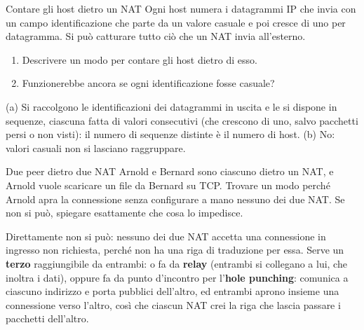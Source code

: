 \begin{esercizio}{Contare gli host dietro un NAT}
Ogni host numera i datagrammi IP che invia con un campo identificazione che parte da un valore casuale e poi cresce di uno per datagramma.
Si può catturare tutto ciò che un NAT invia all'esterno.
\begin{enumerate}[label=(\alph*)]
    \item Descrivere un modo per contare gli host dietro di esso.
    \item Funzionerebbe ancora se ogni identificazione fosse casuale?
\end{enumerate}

\svolgimento
(a) Si raccolgono le identificazioni dei datagrammi in uscita e le si dispone in sequenze, ciascuna fatta di valori consecutivi (che
crescono di uno, salvo pacchetti persi o non visti): il numero di sequenze distinte è il numero di host. (b) No: valori casuali non si
lasciano raggruppare.
\end{esercizio}

\begin{esercizio}{Due peer dietro due NAT}
Arnold e Bernard sono ciascuno dietro un NAT, e Arnold vuole scaricare un file da Bernard su TCP. Trovare un modo perché Arnold apra la
connessione senza configurare a mano nessuno dei due NAT. Se non si può, spiegare esattamente che cosa lo impedisce.

\svolgimento
Direttamente non si può: nessuno dei due NAT accetta una connessione in ingresso non richiesta, perché non ha una riga di traduzione per
essa. Serve un \textbf{terzo} raggiungibile da entrambi: o fa da \textbf{relay} (entrambi si collegano a lui, che inoltra i dati), oppure
fa da punto d'incontro per l'\textbf{hole punching}: comunica a ciascuno indirizzo e porta pubblici dell'altro, ed entrambi aprono insieme
una connessione verso l'altro, così che ciascun NAT crei la riga che lascia passare i pacchetti dell'altro.
\end{esercizio}

